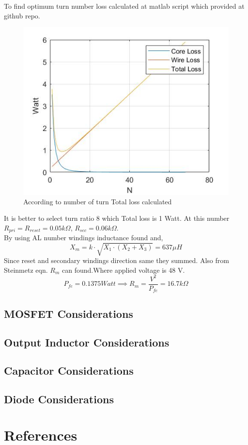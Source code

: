 \documentclass{article}
\begin{document}
To find optimum turn number loss calculated at matlab script which provided at github repo.
\begin{figure}[H]
    \centering
    \includegraphics[width=0.5\linewidth]{number.jpg}
    \caption {According to number of turn Total loss calculated}
    \label{fig:sepic_cap_ideal}
\end{figure}
It is better to select turn ratio 8 which Total loss is 1 Watt.
At this number $R_{pri}=R_{reset}=0.05 k\Omega$, $R_{sec}=0.06 k\Omega$.\\
By using AL number windings inductance found and,
\begin{equation}
    X_m=k\cdot \sqrt{X_1\cdot (X_2+X_3)}=637 \mu H 
\end{equation}
Since reset and secondary windings direction same they summed. Also from Steinmetz eqn. $R_m$ can found.Where applied voltage is 48 V.
\begin{equation}
    P_{fe}=0.1375 Watt \implies R_m=\frac{V^2}{P_{fe}}=16.7k\Omega
\end{equation}
\subsection{MOSFET Considerations}
\subsection{Output Inductor Considerations}
\subsection{Capacitor Considerations}
\subsection{Diode Considerations}
\section{References}
\printbibliography
\end{document}
